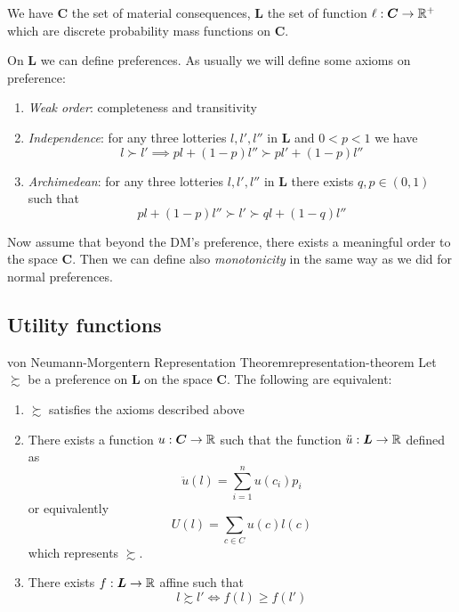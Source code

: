 \documentclass[12pt]{extarticle}
\begin{document}
We have $\bm C$ the set of material consequences, $\bm L$ the set of function $\ell: \bm C \to \mathbb{R}^+$ which are discrete probability mass functions on $\bm C$.

On $\bm L$ we can define preferences.
As usually we will define some axioms on preference:
\begin{enumerate}
    \item \emph{Weak order}: completeness and transitivity
    \item \emph{Independence}: for any three lotteries $l, l', l''$ in $\bm L$ and $0<p<1$ we have
          \begin{equation}
              l \succ l' \implies pl + (1-p) l'' \succ pl' + (1- p)l''
          \end{equation}

    \item \emph{Archimedean}: for any three lotteries $l, l', l''$ in $\bm L$ there exists $q, p \in (0, 1)$ such that
          \begin{equation}
              pl + (1-p)l'' \succ l' \succ ql + (1-q)l''
          \end{equation}
\end{enumerate}

Now assume that beyond the DM's preference, there exists a meaningful order to the space $\bm C$.
Then we can define also \emph{monotonicity} in the same way as we did for normal preferences.

\subsection{Utility functions}

\begin{theorem}{von Neumann-Morgentern Representation Theorem}{representation-theorem}
    Let $\succsim$ be a preference on $\bm L$ on the space $\bm C$.
    The following are equivalent:
    \begin{enumerate}
        \item $\succsim$ satisfies the axioms described above
        \item There exists a function $u:\bm C \to \mathbb{R}$ such that the function $\ddot u : \bm L \to \mathbb{R}$ defined as
              \begin{equation}
                  \ddot u(l) = \sum^n_{i = 1} u(c_i) p_i
              \end{equation}
              or equivalently
              \begin{equation}
                  U(l) = \sum_{c \in C} u(c) l(c)
              \end{equation}
              which represents $\succsim$.
        \item There exists $f:\bm L \to \mathbb{R}$ affine such that
              \begin{equation}
                  l \succsim l' \iff f(l) \geq f(l')
              \end{equation}
    \end{enumerate}
\end{theorem}
\end{document}

